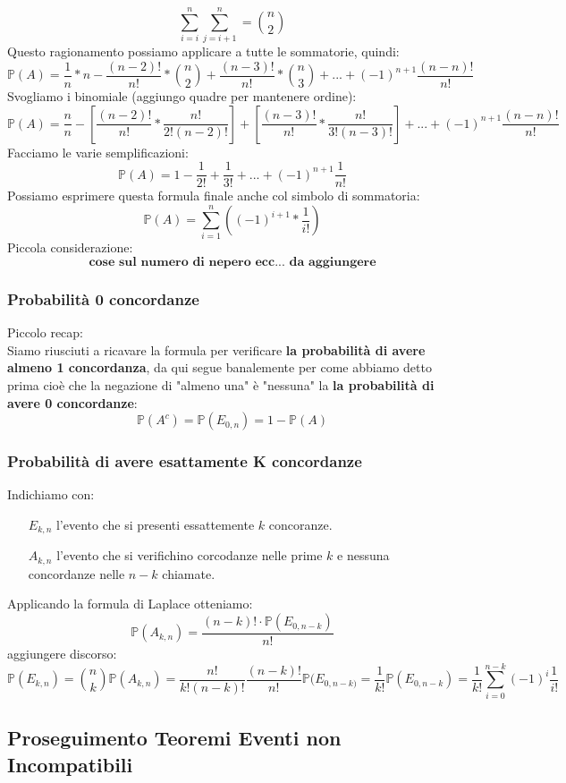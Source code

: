 $$ \sum_{i=i}^n \sum_{j=i+1}^n = \binom{n}{2} $$
Questo ragionamento possiamo applicare a tutte le sommatorie, quindi:
$$ \mathbb{P}(A) = \frac{1}{n} * n - \frac{(n-2)!}{n!} * \binom{n}{2} + \frac{(n-3)!}{n!} * \binom{n}{3} + ... + (-1)^{n+1} \frac{(n-n)!}{n!} $$
Svogliamo i binomiale (aggiungo quadre per mantenere ordine):
$$ \mathbb{P}(A) = \frac{n}{n} - [ \frac{(n-2)!}{n!} * \frac{n!}{2!(n-2)!} ] +  [ \frac{(n-3)!}{n!} * \frac{n!}{3! (n-3)!} ] + ... + (-1)^{n+1} \frac{(n-n)!}{n!} $$
Facciamo le varie semplificazioni:
$$ \mathbb{P}(A) = 1 - \frac{1}{2!} + \frac{1}{3!} + ... + (-1)^{n+1} \frac{1}{n!} $$
Possiamo esprimere questa formula finale anche col simbolo di sommatoria:
$$ \mathbb{P}(A) = \sum_{i=1}^n ((-1)^{i+1} * \frac{1}{i!}) $$
Piccola considerazione:
$$ \textbf{cose sul numero di nepero ecc... da aggiungere} $$
\subsubsection{Probabilità 0 concordanze}
Piccolo recap:\\
Siamo riusciuti a ricavare la formula per verificare \textbf{la probabilità di avere almeno 1 concordanza}, da qui segue banalemente per come abbiamo detto prima cioè che la negazione di "almeno una" è "nessuna" la \textbf{la probabilità di avere 0 concordanze}:
$$ \mathbb{P}(A^c) = \mathbb{P}(E_{0,n}) = 1 - \mathbb{P}(A) $$

\subsubsection{Probabilità di avere esattamente K concordanze}
Indichiamo con:
\begin{itemize}
\item[$E_{k,n}$] l'evento che si presenti essattemente $k$ concoranze.
\item[$A_{k,n}$] l'evento che si verifichino corcodanze nelle prime $k$ e nessuna concordanze nelle $n-k$ chiamate.
\end{itemize}
Applicando la formula di Laplace otteniamo:
$$ \mathbb{P}(A_{k,n}) = \frac{(n-k)! \cdot \mathbb{P}(E_{0,n-k})}{n!} $$
aggiungere discorso:
$$ \mathbb{P}(E_{k,n}) = \binom{n}{k}\mathbb{P}(A_{k,n}) = \frac{n!}{k!(n-k)!} \frac{(n-k)!}{n!} \mathbb{P}(E_{0,n-k)} = \frac{1}{k!}\mathbb{P}(E_{0,n-k}) = \frac{1}{k!} \sum_{i=0}^{n-k} (-1)^i \frac{1}{i!} $$

\subsection{Proseguimento Teoremi Eventi non Incompatibili}
